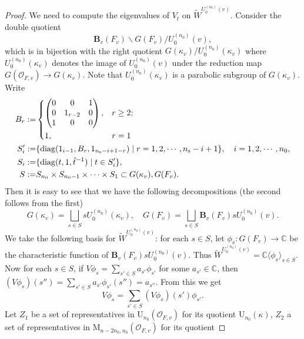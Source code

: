 \documentclass[12pt,oneside,reqno]{amsart}
\theoremstyle{plain}
\begin{document}
\begin{proof}
		
		We need to compute the eigenvalues of
		$V_t$ on
		$\widetilde{W}^{U_0^{(n_0)}(v)}$.
		Consider the double quotient
		\[
		\mathbf{B}_v(F_v)\backslash
		G(F_v)/U_0^{(n_0)}(v),
		\]
		which is in bijection with
		the right quotient
		$ G(\kappa_v)
		/U_0^{(n_0)}(\kappa_v)$
		where
		$U_0^{(n_0)}(\kappa_v)$
		denotes the image of
		$U_0^{(n_0)}(v)$
		under the reduction map
		$ G(\mathcal{O}_{F,v})
		\rightarrow
		G(\kappa_v)$.
		Note that
		$U_0^{(n_0)}(\kappa_v)$
		is a parabolic subgroup of
		$ G(\kappa_v)$.
		Write
		\begin{align*}
			B_r
			:=
			&
			\begin{cases*}
				\begin{pmatrix}
					0 & 0 & 1 \\
					0 & 1_{r-2} & 0 \\
					1 & 0 & 0
				\end{pmatrix},
				&
				$r\geq2$;
				\\
				1,
				&
				$r=1$
			\end{cases*}
			\\
			S_i'
			:=
			&
			\{
			\mathrm{diag}(1_{i-1},B_r,1_{n_\mathrm{s}-i+1-r})
			\mid r=1,2,\cdots,n_\mathrm{s}-i+1
			\},
			\quad
			i=1,2,\cdots,n_0,
			\\
			S_i
			:=
			&
			\{
			\mathrm{diag}(t,1,\hat{t}^{-1})\mid 
			t\in S_i'
			\},
			\\
			S
			:=
			&
			S_{n_0}\times S_{n_0-1}\times\cdots\times S_1
			\subset
			G(\kappa_v),
			G(F_v).
		\end{align*}
		Then it is easy to see that we have the following decompositions (the second follows from the first)
		\[
		G(\kappa_v)
		=
		\bigsqcup_{s\in S}
		sU_0^{(n_0)}(\kappa_v),
		\quad
		G(F_v)
		=
		\bigsqcup_{s\in S}
		\mathbf{B}_v(F_v)sU_0^{(n_0)}(v).
		\]
		We take the following basis for	$\widetilde{W}^{U_0^{(n_0)}(v)}$: for each $s\in S$, let $\phi_s\colon	G(F_v)\rightarrow\mathbb{C}$ be the characteristic function of	$\mathbf{B}_v(F_v)sU_0^{(n_0)}(v)$.	Thus
		$\widetilde{W}^{U_0^{(n_0)}(v)}=\mathbb{C}\langle\phi_s\rangle_{s\in S}$.
		Now for each $s\in S$, if $V\phi_s=\sum_{s'\in S}a_{s'}\phi_{s'}$
		for some $a_{s'}\in\mathbb{C}$,	then $(V\phi_s)(s'')=\sum_{s'\in S}a_{s'}\phi_{s'}(s'')=a_{s''}$. From this we get
		\[
		V\phi_s
		=
		\sum_{s'\in S}
		(V\phi_s)(s')\phi_{s'}.
		\]
		Let $Z_1$ be a set of representatives in $\mathrm{U}_{n_0}(\mathcal{O}_{F,v})$ for its quotient $\mathrm{U}_{n_0}(\kappa)$, $Z_2$ a set of representatives in
		$\mathrm{M}_{n-2n_0,n_0}(\mathcal{O}_{F,v})$ for its quotient

\end{proof}
\end{document}
